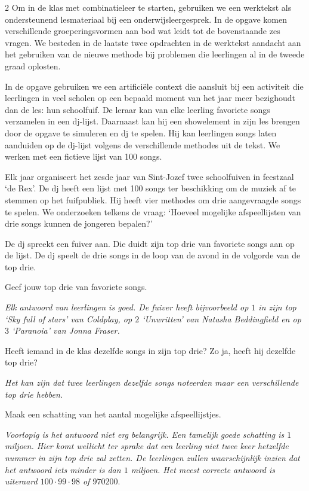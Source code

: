 \begin{multicols}{2}
Om in de klas met combinatieleer te starten, gebruiken we een werktekst als ondersteunend lesmateriaal bij een onderwijsleergesprek. In de opgave komen verschillende groeperingsvormen aan bod wat leidt tot de bovenstaande zes vragen. We besteden in de laatste twee opdrachten in de werktekst aandacht aan het gebruiken van de nieuwe methode bij problemen die leerlingen al in de tweede graad oplosten.  

In de opgave gebruiken we een artificiële context die aansluit bij een activiteit die leerlingen in veel scholen op een bepaald moment van het jaar meer bezighoudt dan de les: hun schoolfuif. De leraar kan van elke leerling favoriete songs verzamelen in een dj-lijst. Daarnaast kan hij een showelement in zijn les brengen door de opgave te simuleren en dj te spelen. Hij kan leerlingen songs laten aanduiden op de dj-lijst volgens de verschillende methodes uit de tekst. We werken met een fictieve lijst van 100 songs.

\end{multicols}

Elk jaar organiseert het zesde jaar van Sint-Jozef twee schoolfuiven in feestzaal ‘de Rex’. De dj heeft een lijst met 100 songs ter beschikking om de muziek af te stemmen op het fuifpubliek. Hij heeft vier methodes om drie aangevraagde songs te spelen. We onderzoeken telkens de vraag: `Hoeveel mogelijke afspeellijsten van drie songs kunnen de jongeren bepalen?’

De dj spreekt een fuiver aan. Die duidt zijn top drie van favoriete songs aan op de lijst. De dj speelt de drie songs in de loop van de avond in de volgorde van de top drie.

\begin{werktekstoef}

\item{Geef jouw top drie van favoriete songs.}

\emph{Elk antwoord van leerlingen is goed. De fuiver heeft bijvoorbeeld op $1$ in zijn top ‘Sky full of stars’ van Coldplay, op $2$ ‘Unwritten’ van Natasha Beddingfield en op $3$ ‘Paranoia’ van Jonna Fraser.}

\item{Heeft iemand in de klas dezelfde songs in zijn top drie? Zo ja, heeft hij dezelfde top drie?}

\emph{Het kan zijn dat twee leerlingen dezelfde songs noteerden maar een verschillende top drie hebben.}

\item{Maak een schatting van het aantal mogelijke afspeellijstjes.}

\emph{Voorlopig is het antwoord niet erg belangrijk. Een tamelijk goede schatting is $1$ miljoen. Hier komt wellicht ter sprake dat een leerling niet twee keer hetzelfde nummer in zijn top drie zal zetten. De leerlingen zullen waarschijnlijk inzien dat het antwoord iets minder is dan $1$ miljoen. Het meest correcte antwoord is uiteraard $100 \cdot 99 \cdot 98$ of $970 200$}.

\end{werktekstoef}

